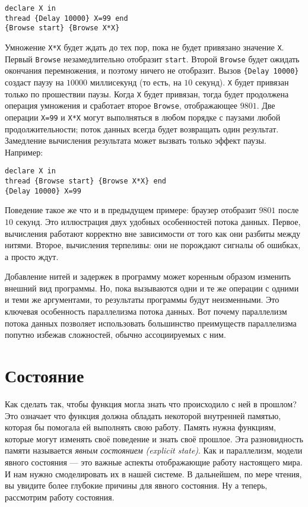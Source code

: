 \begin{lstlisting}
declare X in
thread {Delay 10000} X=99 end
{Browse start} {Browse X*X}
\end{lstlisting}

Умножение \lstinline|X*X| будет ждать до тех пор, пока не будет привязано значение \lstinline|X|. Первый \lstinline|Browse| незамедлительно отобразит \lstinline|start|. Второй \lstinline|Browse| будет ожидать окончания перемножения, и поэтому ничего не отобразит. Вызов \lstinline|{Delay 10000}| создаст паузу на $10000$ миллисекунд (то есть, на $10$ секунд). \lstinline|X| будет привязан только по прошествии паузы. Когда \lstinline|X| будет привязан, тогда будет продолжена операция умножения и сработает второе \lstinline|Browse|, отображающее $9801$. Две операции \lstinline|X=99| и \lstinline|X*X| могут выполняться в любом порядке с паузами любой продолжительности; поток данных всегда будет возвращать один результат. Замедление вычисления результата может вызвать только эффект паузы. Например:

\begin{lstlisting}
declare X in
thread {Browse start} {Browse X*X} end
{Delay 10000} X=99
\end{lstlisting}

Поведение такое же что и в предыдущем примере: браузер отобразит $9801$ после $10$ секунд. Это иллюстрация двух удобных особенностей потока данных. Первое, вычисления работают корректно вне зависимости от того как они разбиты между нитями. Второе, вычисления терпеливы: они не порождают сигналы об ошибках, а просто ждут.

Добавление нитей и задержек в программу может коренным образом изменить внешний вид программы. Но, пока вызываются одни и те же операции с одними и теми же аргументами, то результаты программы будут неизменными. Это ключевая особенность параллелизма потока данных. Вот почему параллелизм потока данных позволяет использовать большинство преимуществ параллелизма попутно избежав сложностей, обычно ассоциируемых с ним.

\section{Состояние}

Как сделать так, чтобы функция могла знать что происходило с ней в прошлом? Это означает что функция должна обладать некоторой внутренней памятью, которая бы помогала ей выполнять свою работу. Память нужна функциям, которые могут изменять своё поведение и знать своё прошлое. Эта разновидность памяти называется \emph{явным состоянием (explicit state)}. Как и параллелизм, модели явного состояния --- это важные аспекты отображающие работу настоящего мира. И нам нужно смоделировать их в нашей системе. В дальнейшем, по мере чтения, вы увидите более глубокие причины для явного состояния. Ну а теперь, рассмотрим работу состояния.

